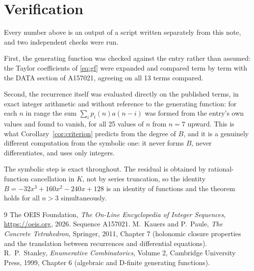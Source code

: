 \documentclass[11pt,a4paper]{article}
\theoremstyle{plain}
\theoremstyle{definition}
\begin{document}
\section{Verification}

Every number above is an output of a script written separately from this note, and two
independent checks were run.

First, the generating function was checked against the entry rather than assumed: the
Taylor coefficients of \eqref{eq:gf} were expanded and compared term by term with the DATA
section of A157021, agreeing on all 13 terms compared.

Second, the recurrence itself was evaluated directly on the published terms, in exact
integer arithmetic and without reference to the generating function: for each $n$ in range
the sum $\sum_{i}p_{i}(n)a(n-i)$ was formed from the entry's own values and found to
vanish, for all 25 values of $n$ from $n=7$ upward. This is what
Corollary~\ref{cor:criterion} predicts from the degree of $B$, and it is a genuinely
different computation from the symbolic one: it never forms $B$, never differentiates, and
uses only integers.

The symbolic step is exact throughout. The residual is obtained by rational-function
cancellation in $K$, not by series truncation, so the identity $B=- 32 x^{3} + 160 x^{2} - 240 x + 128$ is an
identity of functions and the theorem holds for all $n>3$ simultaneously.

\begin{thebibliography}{9}
 The OEIS Foundation, \emph{The On-Line Encyclopedia of Integer Sequences},
\url{https://oeis.org}, 2026. Sequence A157021.
 M.~Kauers and P.~Paule, \emph{The Concrete Tetrahedron}, Springer, 2011,
Chapter 7 (holonomic closure properties and the translation between recurrences and
differential equations).
 R.~P.~Stanley, \emph{Enumerative Combinatorics}, Volume 2, Cambridge
University Press, 1999, Chapter 6 (algebraic and D-finite generating functions).
\end{thebibliography}
\end{document}
